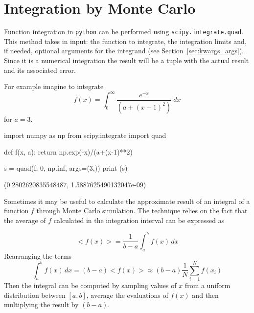 %

\section{Integration by Monte Carlo}
\label{sec:integration}
Function integration in \texttt{python} can be performed using \texttt{scipy.integrate.quad}. 
This method takes in input: the function to integrate, the integration limits and, if needed, optional arguments for the integrand (see Section~\ref{sec:kwargs_args}). Since it is a numerical integration the result will be a tuple with the actual result and its associated error.

For example imagine to integrate
\begin{equation*}
f(x) = \int_{0}^{\infty}\frac{e^{-x}}{\left(a + (x-1)^2\right)}~dx
\end{equation*}
for $a=3$.

\begin{ipython}
import numpy as np
from scipy.integrate import quad
	
def f(x, a):
    return np.exp(-x)/(a+(x-1)**2)
	
s = quad(f, 0, np.inf, args=(3,))
print (s)
\end{ipython}
\begin{ioutput}
(0.2802620835548487, 1.5887625490132047e-09)
\end{ioutput}

Sometimes it may be useful to calculate the approximate result of an integral of a function $f$ through Monte Carlo simulation. The technique relies on the fact that the average of $f$ calculated in the integration interval can be expressed as

\begin{equation}
<f(x)> = \frac{1}{b-a} \int_{a}^{b} f(x) \,dx
\end{equation}
Rearranging the terms
\begin{equation}
\int_{a}^{b} f(x) \,dx = 
(b-a) <f(x)> \approx (b-a) \frac{1}{N} \sum_{i=1}^{N} f(x_i)
\end{equation}
Then the integral can be computed by sampling values of $x$ from a uniform distribution between $[a,b]$, average the evaluations of $f(x)$ and then multiplying the result by $(b-a)$.

